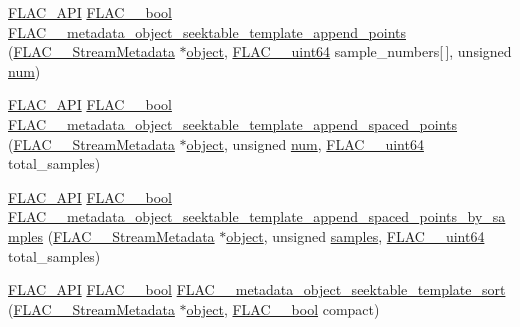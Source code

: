 \begin{DoxyCompactItemize}
\item 
\mbox{\hyperlink{group__flac__export_ga56ca07df8a23310707732b1c0007d6f5}{F\+L\+A\+C\+\_\+\+A\+PI}} \mbox{\hyperlink{ordinals_8h_a95103469f1cbd78b8cf250194985b34e}{F\+L\+A\+C\+\_\+\+\_\+bool}} \mbox{\hyperlink{group__flac__metadata__object_gac27a59879fa8cdf47b75f8d73de82f0e}{F\+L\+A\+C\+\_\+\+\_\+metadata\+\_\+object\+\_\+seektable\+\_\+template\+\_\+append\+\_\+points}} (\mbox{\hyperlink{struct_f_l_a_c_____stream_metadata}{F\+L\+A\+C\+\_\+\+\_\+\+Stream\+Metadata}} $\ast$\mbox{\hyperlink{_s_d_l__opengl__glext_8h_ab49790263c78300fbf05719e38246198}{object}}, \mbox{\hyperlink{ordinals_8h_aa78c8c70a3eb8a58af7436f278acde8e}{F\+L\+A\+C\+\_\+\+\_\+uint64}} sample\+\_\+numbers\mbox{[}$\,$\mbox{]}, unsigned \mbox{\hyperlink{_s_d_l__opengl__glext_8h_abb50fc1ead3a02a46fb52daa2045f95c}{num}})
\item 
\mbox{\hyperlink{group__flac__export_ga56ca07df8a23310707732b1c0007d6f5}{F\+L\+A\+C\+\_\+\+A\+PI}} \mbox{\hyperlink{ordinals_8h_a95103469f1cbd78b8cf250194985b34e}{F\+L\+A\+C\+\_\+\+\_\+bool}} \mbox{\hyperlink{group__flac__metadata__object_gab96c6585578c87f6853731860e2872e0}{F\+L\+A\+C\+\_\+\+\_\+metadata\+\_\+object\+\_\+seektable\+\_\+template\+\_\+append\+\_\+spaced\+\_\+points}} (\mbox{\hyperlink{struct_f_l_a_c_____stream_metadata}{F\+L\+A\+C\+\_\+\+\_\+\+Stream\+Metadata}} $\ast$\mbox{\hyperlink{_s_d_l__opengl__glext_8h_ab49790263c78300fbf05719e38246198}{object}}, unsigned \mbox{\hyperlink{_s_d_l__opengl__glext_8h_abb50fc1ead3a02a46fb52daa2045f95c}{num}}, \mbox{\hyperlink{ordinals_8h_aa78c8c70a3eb8a58af7436f278acde8e}{F\+L\+A\+C\+\_\+\+\_\+uint64}} total\+\_\+samples)
\item 
\mbox{\hyperlink{group__flac__export_ga56ca07df8a23310707732b1c0007d6f5}{F\+L\+A\+C\+\_\+\+A\+PI}} \mbox{\hyperlink{ordinals_8h_a95103469f1cbd78b8cf250194985b34e}{F\+L\+A\+C\+\_\+\+\_\+bool}} \mbox{\hyperlink{group__flac__metadata__object_gabf797b64b96808cabf1d995573680fe9}{F\+L\+A\+C\+\_\+\+\_\+metadata\+\_\+object\+\_\+seektable\+\_\+template\+\_\+append\+\_\+spaced\+\_\+points\+\_\+by\+\_\+samples}} (\mbox{\hyperlink{struct_f_l_a_c_____stream_metadata}{F\+L\+A\+C\+\_\+\+\_\+\+Stream\+Metadata}} $\ast$\mbox{\hyperlink{_s_d_l__opengl__glext_8h_ab49790263c78300fbf05719e38246198}{object}}, unsigned \mbox{\hyperlink{_s_d_l__opengl__glext_8h_aba70cd077c2c52c15358c231c6d293aa}{samples}}, \mbox{\hyperlink{ordinals_8h_aa78c8c70a3eb8a58af7436f278acde8e}{F\+L\+A\+C\+\_\+\+\_\+uint64}} total\+\_\+samples)
\item 
\mbox{\hyperlink{group__flac__export_ga56ca07df8a23310707732b1c0007d6f5}{F\+L\+A\+C\+\_\+\+A\+PI}} \mbox{\hyperlink{ordinals_8h_a95103469f1cbd78b8cf250194985b34e}{F\+L\+A\+C\+\_\+\+\_\+bool}} \mbox{\hyperlink{group__flac__metadata__object_gaee6a1f08321b56a3fa65af94dd7830cd}{F\+L\+A\+C\+\_\+\+\_\+metadata\+\_\+object\+\_\+seektable\+\_\+template\+\_\+sort}} (\mbox{\hyperlink{struct_f_l_a_c_____stream_metadata}{F\+L\+A\+C\+\_\+\+\_\+\+Stream\+Metadata}} $\ast$\mbox{\hyperlink{_s_d_l__opengl__glext_8h_ab49790263c78300fbf05719e38246198}{object}}, \mbox{\hyperlink{ordinals_8h_a95103469f1cbd78b8cf250194985b34e}{F\+L\+A\+C\+\_\+\+\_\+bool}} compact)

\end{DoxyCompactItemize}

